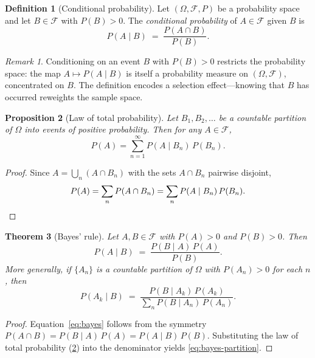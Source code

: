 \documentclass[12pt]{amsart}
\newtheorem{theorem}{Theorem}[section]
\newtheorem{proposition}[theorem]{Proposition}
\theoremstyle{definition}
\newtheorem{definition}[theorem]{Definition}
\theoremstyle{remark}
\newtheorem*{remark}{Remark}
\newcommand{\cF}{\mathcal{F}}
\begin{document}
\begin{definition}[Conditional probability]\label{def:cond-prob}
Let $(\Omega, \cF, P)$ be a probability space and let $B \in \cF$ with $P(B) > 0$. The \emph{conditional probability} of $A \in \cF$ given $B$ is
\[
P(A \mid B) \;=\; \frac{P(A \cap B)}{P(B)}.
\]
\end{definition}

\begin{remark}
Conditioning on an event $B$ with $P(B) > 0$ restricts the probability space: the map $A \mapsto P(A \mid B)$ is itself a probability measure on $(\Omega, \cF)$, concentrated on $B$. The definition encodes a selection effect---knowing that $B$ has occurred reweights the sample space.
\end{remark}

\begin{proposition}[Law of total probability]\label{prop:total-prob}
Let $B_1, B_2, \ldots$ be a countable partition of $\Omega$ into events of positive probability. Then for any $A \in \cF$,
\[
P(A) = \sum_{n=1}^\infty P(A \mid B_n)\, P(B_n).
\]
\end{proposition}

\begin{proof}
Since $A = \bigcup_n (A \cap B_n)$ with the sets $A \cap B_n$ pairwise disjoint,
\[
P(A) = \sum_n P(A \cap B_n) = \sum_n P(A \mid B_n)\, P(B_n). \qedhere
\]
\end{proof}

\begin{theorem}[Bayes' rule]\label{thm:bayes}
Let $A, B \in \cF$ with $P(A) > 0$ and $P(B) > 0$. Then
\begin{equation}\label{eq:bayes}
P(A \mid B) \;=\; \frac{P(B \mid A)\, P(A)}{P(B)}.
\end{equation}
More generally, if $\{A_n\}$ is a countable partition of $\Omega$ with $P(A_n) > 0$ for each $n$, then
\begin{equation}\label{eq:bayes-partition}
P(A_k \mid B) \;=\; \frac{P(B \mid A_k)\, P(A_k)}{\displaystyle\sum_n P(B \mid A_n)\, P(A_n)}.
\end{equation}
\end{theorem}

\begin{proof}
Equation~\eqref{eq:bayes} follows from the symmetry $P(A \cap B) = P(B \mid A)\, P(A) = P(A \mid B)\, P(B)$. Substituting the law of total probability (\cref{prop:total-prob}) into the denominator yields \eqref{eq:bayes-partition}.
\end{proof}
\end{document}
